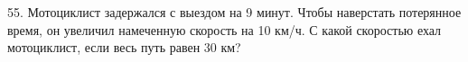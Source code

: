 55. Мотоциклист задержался с выездом на 9 минут. Чтобы наверстать потерянное время, он увеличил намеченную скорость на 10 км/ч. С какой скоростью ехал мотоциклист, если весь путь равен 30 км?\\
